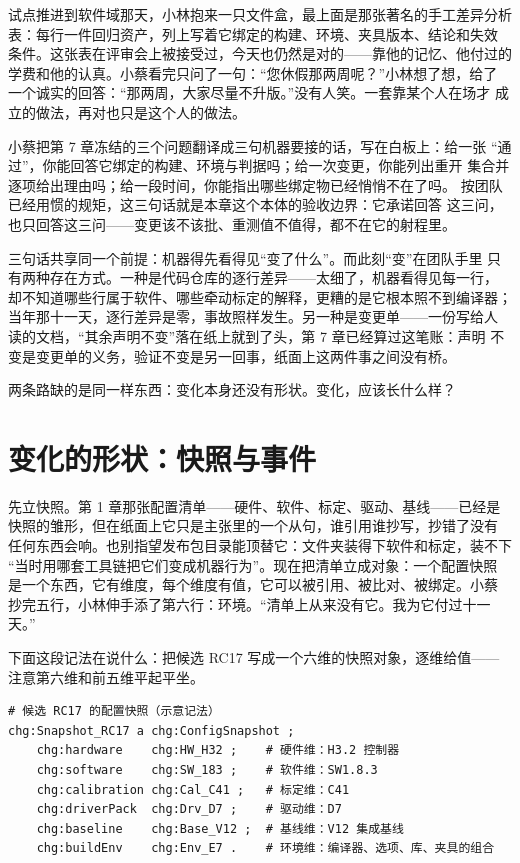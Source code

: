 试点推进到软件域那天，小林抱来一只文件盒，最上面是那张著名的手工差异分析
表：每行一件回归资产，列上写着它绑定的构建、环境、夹具版本、结论和失效
条件。这张表在评审会上被接受过，今天也仍然是对的——靠他的记忆、他付过的
学费和他的认真。小蔡看完只问了一句：“您休假那两周呢？”小林想了想，给了
一个诚实的回答：“那两周，大家尽量不升版。”没有人笑。一套靠某个人在场才
成立的做法，再对也只是这个人的做法。

小蔡把第 7 章冻结的三个问题翻译成三句机器要接的话，写在白板上：给一张
“通过”，你能回答它绑定的构建、环境与判据吗；给一次变更，你能列出重开
集合并逐项给出理由吗；给一段时间，你能指出哪些绑定物已经悄悄不在了吗。
按团队已经用惯的规矩，这三句话就是本章这个本体的验收边界：它承诺回答
这三问，也只回答这三问——变更该不该批、重测值不值得，都不在它的射程里。

三句话共享同一个前提：机器得先看得见“变了什么”。而此刻“变”在团队手里
只有两种存在方式。一种是代码仓库的逐行差异——太细了，机器看得见每一行，
却不知道哪些行属于软件、哪些牵动标定的解释，更糟的是它根本照不到编译器；
当年那十一天，逐行差异是零，事故照样发生。另一种是变更单——一份写给人
读的文档，“其余声明不变”落在纸上就到了头，第 7 章已经算过这笔账：声明
不变是变更单的义务，验证不变是另一回事，纸面上这两件事之间没有桥。

两条路缺的是同一样东西：变化本身还没有形状。变化，应该长什么样？

\section{变化的形状：快照与事件}

先立快照。第 1 章那张配置清单——硬件、软件、标定、驱动、基线——已经是
快照的雏形，但在纸面上它只是主张里的一个从句，谁引用谁抄写，抄错了没有
任何东西会响。也别指望发布包目录能顶替它：文件夹装得下软件和标定，装不下
“当时用哪套工具链把它们变成机器行为”。现在把清单立成对象：一个配置快照
是一个东西，它有维度，每个维度有值，它可以被引用、被比对、被绑定。小蔡
抄完五行，小林伸手添了第六行：环境。“清单上从来没有它。我为它付过十一天。”

下面这段记法在说什么：把候选 RC17 写成一个六维的快照对象，逐维给值——
注意第六维和前五维平起平坐。

\nopagebreak[4]
\begin{codebox}
\begin{Verbatim}[fontsize=\small,breaklines=true,breakanywhere=true,breaksymbolleft={},breaksymbolright={}]
# 候选 RC17 的配置快照（示意记法）
chg:Snapshot_RC17 a chg:ConfigSnapshot ;
    chg:hardware    chg:HW_H32 ;    # 硬件维：H3.2 控制器
    chg:software    chg:SW_183 ;    # 软件维：SW1.8.3
    chg:calibration chg:Cal_C41 ;   # 标定维：C41
    chg:driverPack  chg:Drv_D7 ;    # 驱动维：D7
    chg:baseline    chg:Base_V12 ;  # 基线维：V12 集成基线
    chg:buildEnv    chg:Env_E7 .    # 环境维：编译器、选项、库、夹具的组合
\end{Verbatim}
\end{codebox}

